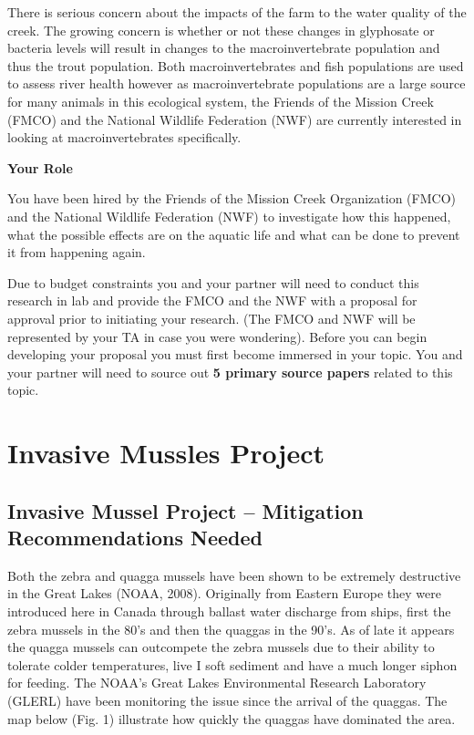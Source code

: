 \documentclass[
]{book}
\begin{document}
There is serious concern about the impacts of the farm to the water quality of the creek. The growing concern is whether or not these changes in glyphosate or bacteria levels will result in changes to the macroinvertebrate population and thus the trout population. Both macroinvertebrates and fish populations are used to assess river health however as macroinvertebrate populations are a large source for many animals in this ecological system, the Friends of the Mission Creek (FMCO) and the National Wildlife Federation (NWF) are currently interested in looking at macroinvertebrates specifically.

\textbf{Your Role}

You have been hired by the Friends of the Mission Creek Organization (FMCO) and the National Wildlife Federation (NWF) to investigate how this happened, what the possible effects are on the aquatic life and what can be done to prevent it from happening again.

Due to budget constraints you and your partner will need to conduct this research in lab and provide the FMCO and the NWF with a proposal for approval prior to initiating your research. (The FMCO and NWF will be represented by your TA in case you were wondering). Before you can begin developing your proposal you must first become immersed in your topic. You and your partner will need to source out \textbf{5 primary source papers} related to this topic.

\hypertarget{invasive-mussles-project}{%
\section*{Invasive Mussles Project}\label{invasive-mussles-project}}

\hypertarget{invasive-mussel-project-mitigation-recommendations-needed}{%
\subsection*{Invasive Mussel Project -- Mitigation Recommendations Needed}\label{invasive-mussel-project-mitigation-recommendations-needed}}

Both the zebra and quagga mussels have been shown to be extremely destructive in the Great Lakes (NOAA, 2008). Originally from Eastern Europe they were introduced here in Canada through ballast water discharge from ships, first the zebra mussels in the 80's and then the quaggas in the 90's. As of late it appears the quagga mussels can outcompete the zebra mussels due to their ability to tolerate colder temperatures, live I soft sediment and have a much longer siphon for feeding. The NOAA's Great Lakes Environmental Research Laboratory (GLERL) have been monitoring the issue since the arrival of the quaggas. The map below (Fig. 1) illustrate how quickly the quaggas have dominated the area.
\end{document}
